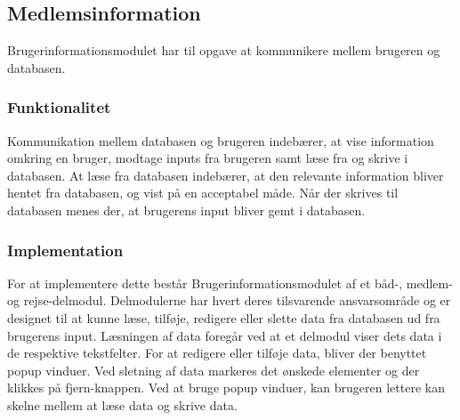 \subsection{Medlemsinformation}
\label{sub:Medlemsinformation}

Brugerinformationsmodulet har til opgave at kommunikere mellem brugeren og databasen.

\subsubsection{Funktionalitet}
\label{ssub:Medlemsinformation_funktionalitet}

Kommunikation mellem databasen og brugeren indebærer, at vise information omkring en bruger, modtage inputs fra brugeren samt læse fra og skrive i databasen. At læse fra databasen indebærer, at den relevante information bliver hentet fra databasen, og vist på en acceptabel måde. Når der skrives til databasen menes der, at brugerens input bliver gemt i databasen. 

\subsubsection{Implementation}
\label{ssub:Medlemsinformation_implementation}

For at implementere dette består Brugerinformationsmodulet af et båd-, medlem- og rejse-delmodul. Delmodulerne har hvert deres tilsvarende ansvarsområde og er designet til at kunne læse, tilføje, redigere eller slette data fra databasen ud fra brugerens input. Læsningen af data foregår ved at et delmodul viser dets data i de respektive tekstfelter. For at redigere eller tilføje data, bliver der benyttet popup vinduer. Ved sletning af data markeres det ønskede elementer og der klikkes på fjern-knappen.
Ved at bruge popup vinduer, kan brugeren lettere kan skelne mellem at læse data og skrive data.
